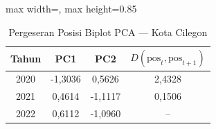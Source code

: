 \begin{table}[H]
\centering
\caption{Pergeseran Posisi Biplot PCA --- Kota Cilegon} \label{tab:samplejarak_pca_skor_kota_cilegon}
\begin{adjustbox}{max width=\textwidth, max height=0.85\textheight}
\begin{tabular}{|c|c|c|c|}
\hline
\textbf{Tahun} & \textbf{PC1} & \textbf{PC2} & \textbf{$D(\text{pos}_t, \text{pos}_{t+1})$} \\
\hline
2020 & -1,3036 & 0,5626 & 2,4328 \\
2021 & 0,4614 & -1,1117 & 0,1506 \\
2022 & 0,6112 & -1,0960 & -- \\
\hline
\end{tabular}
\end{adjustbox}
\end{table}